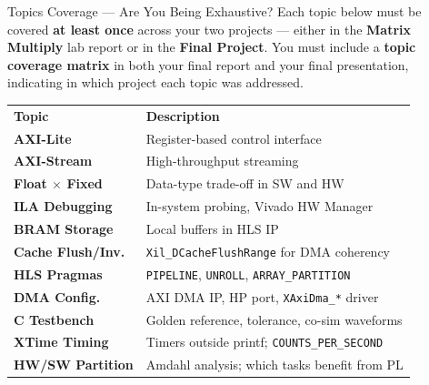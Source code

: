 \documentclass[10pt,aspectratio=169]{beamer}
\begin{document}
\begin{frame}{Topics Coverage --- Are You Being Exhaustive?}
\vspace{0.05cm}
{\small\color{TxtMd}
  Each topic below must be covered \textbf{at least once} across your two projects ---
  either in the \textbf{Matrix Multiply} lab report or in the \textbf{Final Project}.
  You must include a \textbf{topic coverage matrix} in both your final report and
  your final presentation, indicating in which project each topic was addressed.}
\vspace{0.05cm}
\begin{tabular}{m{2.8cm}m{11cm}}
\rowcolor{Navy}
\textbf{\color{white}Topic} & \textbf{\color{white}Description}\\
\textbf{AXI-Lite} & Register-based control interface\\
\textbf{AXI-Stream} & High-throughput streaming\\
\textbf{Float $\times$ Fixed} & Data-type trade-off in SW and HW\\
\textbf{ILA Debugging} & In-system probing, Vivado HW Manager\\
\textbf{BRAM Storage} & Local buffers in HLS IP\\
\textbf{Cache Flush/Inv.} & \texttt{Xil\_DCacheFlushRange} for DMA coherency\\
\textbf{HLS Pragmas} & \texttt{PIPELINE}, \texttt{UNROLL}, \texttt{ARRAY\_PARTITION}\\
\textbf{DMA Config.} & AXI DMA IP, HP port, \texttt{XAxiDma\_*} driver\\
\textbf{C Testbench} & Golden reference, tolerance, co-sim waveforms\\
\textbf{XTime Timing} & Timers outside printf; \texttt{COUNTS\_PER\_SECOND}\\
\textbf{HW/SW Partition} & Amdahl analysis; which tasks benefit from PL\\
\end{tabular}
\end{frame}
\end{document}
